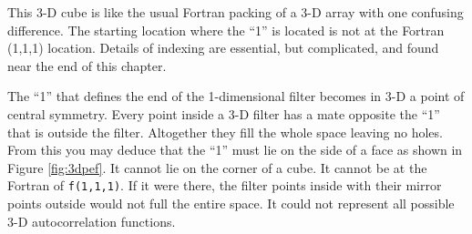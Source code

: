 This 3-D cube is like the usual Fortran packing of a 3-D array
with one confusing difference.   The starting location where the ``1''
is located is not at the Fortran (1,1,1) location.
Details of indexing are essential,
but complicated, and found near the end of this chapter.
\par
{}
The ``1'' that defines the end of the 1-dimensional filter
becomes in 3-D a point of central symmetry.
Every point inside a 3-D filter has a mate opposite the ``1'' that is outside the filter.
Altogether they fill the whole space leaving no holes.
From this you may deduce that the ``1'' must lie
on the side of a face
as shown in Figure \ref{fig:3dpef}.
It cannot lie on the corner of a cube.
It cannot be at the Fortran of \texttt{f(1,1,1)}.
If it were there, the filter points inside
with their mirror points outside would not full the entire space.
It could not represent all possible 3-D autocorrelation functions.


